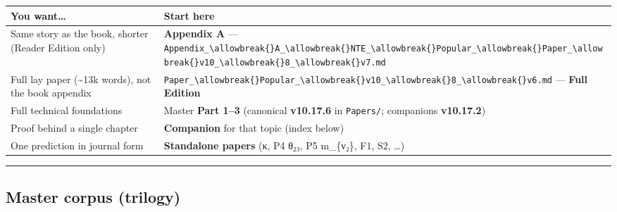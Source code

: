 \documentclass[
  11pt,
]{article}
\newcounter{none} %
\begin{document}
{\def\LTcaptype{none} %
\begin{longtable}[]{@{}
  >{\raggedright\arraybackslash}p{}
  >{\raggedright\arraybackslash}p{}@{}}
\toprule\noalign{}
\begin{minipage}[b]{\linewidth}\raggedright
You want\ldots{}
\end{minipage} & \begin{minipage}[b]{\linewidth}\raggedright
Start here
\end{minipage} \\
\midrule\noalign{}
\endhead
\bottomrule\noalign{}
\endlastfoot
Same story as the book, shorter (Reader Edition only) & \textbf{Appendix
A} ---
\texttt{Appendix\_\textbackslash{}allowbreak\{\}A\_\textbackslash{}allowbreak\{\}NTE\_\textbackslash{}allowbreak\{\}Popular\_\textbackslash{}allowbreak\{\}Paper\_\textbackslash{}allowbreak\{\}v10\_\textbackslash{}allowbreak\{\}8\_\textbackslash{}allowbreak\{\}v7.md} \\
Full lay paper (\textasciitilde13k words), not the book appendix &
\texttt{Paper\_\textbackslash{}allowbreak\{\}Popular\_\textbackslash{}allowbreak\{\}v10\_\textbackslash{}allowbreak\{\}8\_\textbackslash{}allowbreak\{\}v6.md}
--- \textbf{Full Edition} \\
Full technical foundations & Master \textbf{Part 1--3} (canonical
\textbf{v10.17.6} in \texttt{Papers/}; companions \textbf{v10.17.2}) \\
Proof behind a single chapter & \textbf{Companion} for that topic (index
below) \\
One prediction in journal form & \textbf{Standalone papers} (κ, P4 θ₂₃,
P5 m\_\{ν₂\}, F1, S2, \ldots) \\
\end{longtable}
}

\begin{center}\rule{0.5\linewidth}{0.5pt}\end{center}

\subsection{Master corpus (trilogy)}\label{master-corpus-trilogy}
\end{document}
